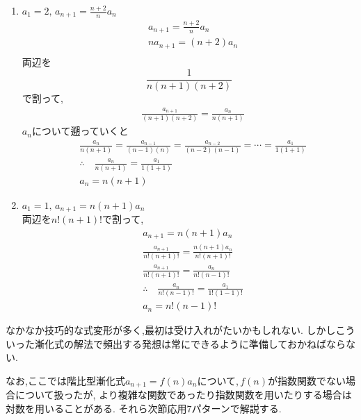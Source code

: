 \documentclass[dvipdfmx,a4paper,11pt,fleqn,openany]{jsbook}
\begin{document}
\begin{enumerate}[label=(\arabic*),parsep=3pt]
        \item $\displaystyle a_1=2,\, a_{n+1}=\frac{n+2}{n}a_n$
              \begin{align*}
                &a_{n+1}=\frac{n+2}{n}a_n\\
                &na_{n+1}=(n+2)a_n\\
              \end{align*}
              両辺を
              \[
                \displaystyle \frac{1}{n(n+1)(n+2)}
              \]
              で割って,
              \begin{align*}        
                &\frac{a_{n+1}}{(n+1)(n+2)}=\frac{a_{n}}{n(n+1)}
              \end{align*}
              $a_n$について遡っていくと
              \begin{align*}
                &\frac{a_{n}}{n(n+1)}=\frac{a_{n-1}}{(n-1)(n)}=\frac{a_{n-2}}{(n-2)(n-1)}=\cdots=\frac{a_{1}}{1(1+1)}\\
                &\therefore \quad \frac{a_{n}}{n(n+1)}=\frac{a_{1}}{1(1+1)}\\
                &a_n=n(n+1)
              \end{align*}
        \item $\displaystyle a_1=1,\, a_{n+1}=n(n+1)a_n$\\
                両辺を$n!(n+1)!$で割って,
              \begin{align*}
                &a_{n+1}=n(n+1)a_n\\
                &\frac{a_{n+1}}{n!(n+1)!}=\frac{n(n+1)a_n}{n!(n+1)!}\\
                &\frac{a_{n+1}}{n!(n+1)!}=\frac{a_n}{n!(n-1)!}\\
                &\therefore \quad \frac{a_n}{n!(n-1)!}=\frac{a_1}{1!(1-1)!}\\
                &a_n=n!(n-1)!
              \end{align*}
      \end{enumerate}

      なかなか技巧的な式変形が多く,最初は受け入れがたいかもしれない.
      しかしこういった漸化式の解法で頻出する発想は常にできるように準備しておかねばならない.

      なお,ここでは階比型漸化式$a_{n+1}=f(n)a_n$について,\,$f(n)$が指数関数でない場合について扱ったが,
      より複雑な関数であったり指数関数を用いたりする場合は対数を用いることがある.
      それら次節応用7パターンで解説する.
      
\end{document}
